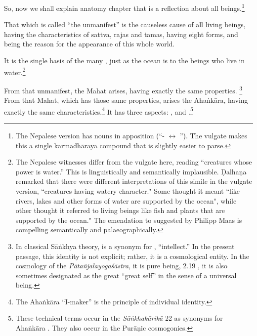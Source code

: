 \begin{translation}
    
    \item [1] 
    
    So, now we shall explain anatomy chapter that is a reflection about all 
    beings.\footnote{The Nepalese version has nouns in apposition 
    (“- $\leftrightarrow$ ”).  The vulgate makes this a 
    single 
    karmadhāraya compound that is slightly easier to parse.} 
    
\item[3]


That which is called “the unmanifest” is the causeless cause of all living beings,  
having the characteristics of sattva, rajas and tamas, having eight forms, and 
being the reason for the appearance of this whole world.
    
It is the single basis of the many , just as the ocean is to the beings who live in
water.\footnote{The Nepalese witnesses differ from the vulgate here,
    reading  “creatures whose power is water.”  This is
    linguistically and semantically implausible. Ḍalhaṇa remarked that
    there were different interpretations of this simile in the vulgate
    version,  “creatures having watery character." Some
    thought it meant ``like rivers, lakes and other forms of water are
    supported by the ocean", while other thought it referred to living
    beings like fish and plants that are supported by the ocean." The
    emendation to  suggested by Philipp Maas is compelling
    semantically and palaeographically.}
    
\item[3.1.4]

From that unmanifest, the Mahat arises, having exactly the same
properties. \footnote{In classical Sāṅkhya theory,  is a
    synonym for , ``intellect.''  In the present passage, this
    identity is not explicit; rather, it is a cosmological entity.  In the
    cosmology of the \emph{Pātañjalayogaśāstra}, it is pure being, 
     2.19 \citep[85]{agas-1904}, it is
    also sometimes designated as the great  ``great self'' in
    the sense of a universal being.} %
    From that Mahat, which has those same properties, arises the
    Ahaṅkāra, having exactly the same characteristics.\footnote{The
        Ahaṅkāra ``I-maker'' is the principle of individual identity.}  It
        has three aspects: , 
        and .\footnote{These technical terms occur
            in the \emph{Sāṅkhakārikā} 22 as synonyms for Ahaṅkāra
            \parencites[46--47]{sast-1948}[187--188]{wezl-1998}. They also
            occur in the Purāṇic cosmogonies.}
            

\end{translation}
